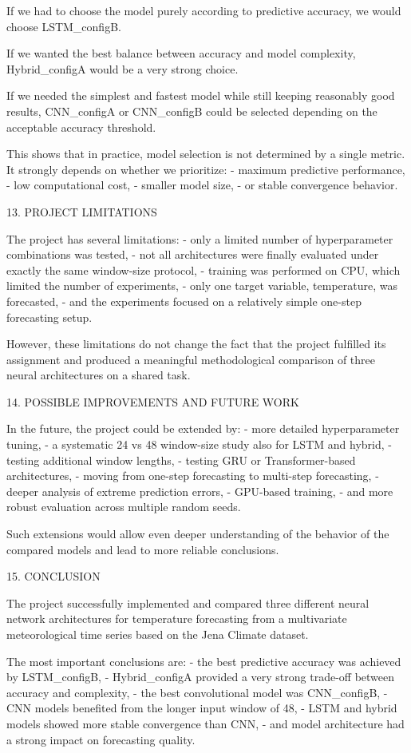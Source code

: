 If we had to choose the model purely according to predictive accuracy, we would choose LSTM_configB.

If we wanted the best balance between accuracy and model complexity, Hybrid_configA would be a very strong choice.

If we needed the simplest and fastest model while still keeping reasonably good results, CNN_configA or CNN_configB could be selected depending on the acceptable accuracy threshold.

This shows that in practice, model selection is not determined by a single metric. It strongly depends on whether we prioritize:
- maximum predictive performance,
- low computational cost,
- smaller model size,
- or stable convergence behavior.

13. PROJECT LIMITATIONS

The project has several limitations:
- only a limited number of hyperparameter combinations was tested,
- not all architectures were finally evaluated under exactly the same window-size protocol,
- training was performed on CPU, which limited the number of experiments,
- only one target variable, temperature, was forecasted,
- and the experiments focused on a relatively simple one-step forecasting setup.

However, these limitations do not change the fact that the project fulfilled its assignment and produced a meaningful methodological comparison of three neural architectures on a shared task.

14. POSSIBLE IMPROVEMENTS AND FUTURE WORK

In the future, the project could be extended by:
- more detailed hyperparameter tuning,
- a systematic 24 vs 48 window-size study also for LSTM and hybrid,
- testing additional window lengths,
- testing GRU or Transformer-based architectures,
- moving from one-step forecasting to multi-step forecasting,
- deeper analysis of extreme prediction errors,
- GPU-based training,
- and more robust evaluation across multiple random seeds.

Such extensions would allow even deeper understanding of the behavior of the compared models and lead to more reliable conclusions.

15. CONCLUSION

The project successfully implemented and compared three different neural network architectures for temperature forecasting from a multivariate meteorological time series based on the Jena Climate dataset.

The most important conclusions are:
- the best predictive accuracy was achieved by LSTM_configB,
- Hybrid_configA provided a very strong trade-off between accuracy and complexity,
- the best convolutional model was CNN_configB,
- CNN models benefited from the longer input window of 48,
- LSTM and hybrid models showed more stable convergence than CNN,
- and model architecture had a strong impact on forecasting quality.

